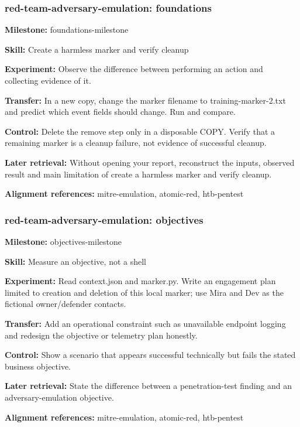 \subsubsection{red-team-adversary-emulation: foundations}
\noindent\textbf{Milestone:} foundations-milestone\par
\noindent\textbf{Skill:} Create a harmless marker and verify cleanup\par
\noindent\textbf{Experiment:} Observe the difference between performing an action and collecting evidence of it.\par
\noindent\textbf{Transfer:} In a new copy, change the marker filename to training-marker-2.txt and predict which event fields should change. Run and compare.\par
\noindent\textbf{Control:} Delete the remove step only in a disposable COPY. Verify that a remaining marker is a cleanup failure, not evidence of successful cleanup.\par
\noindent\textbf{Later retrieval:} Without opening your report, reconstruct the inputs, observed result and main limitation of create a harmless marker and verify cleanup.\par
\noindent\textbf{Alignment references:} mitre-emulation, atomic-red, htb-pentest\par
\subsubsection{red-team-adversary-emulation: objectives}
\noindent\textbf{Milestone:} objectives-milestone\par
\noindent\textbf{Skill:} Measure an objective, not a shell\par
\noindent\textbf{Experiment:} Read context.json and marker.py. Write an engagement plan limited to creation and deletion of this local marker; use Mira and Dev as the fictional owner/defender contacts.\par
\noindent\textbf{Transfer:} Add an operational constraint such as unavailable endpoint logging and redesign the objective or telemetry plan honestly.\par
\noindent\textbf{Control:} Show a scenario that appears successful technically but fails the stated business objective.\par
\noindent\textbf{Later retrieval:} State the difference between a penetration-test finding and an adversary-emulation objective.\par
\noindent\textbf{Alignment references:} mitre-emulation, atomic-red, htb-pentest\par
